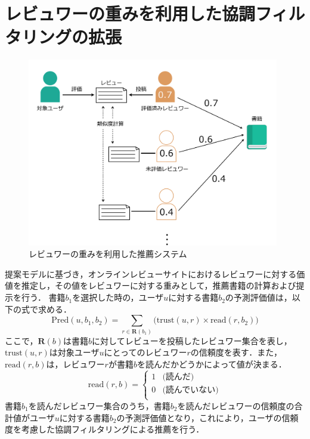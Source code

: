 \documentclass[a4paper,11pt,oneside,openany]{jsbook}
\begin{document}
\section{レビュワーの重みを利用した協調フィルタリングの拡張} %
\begin{figure}[tb]
	\begin{center} %
		\includegraphics[width = 110mm]{figures/model.pdf} %
	\end{center}
	\caption{レビュワーの重みを利用した推薦システム} %
	\label{fig:model} %
\end{figure}
提案モデルに基づき，オンラインレビューサイトにおけるレビュワーに対する価値を推定し，その値をレビュワーに対する重みとして，推薦書籍の計算および提示を行う．
書籍$b_{1}$を選択した時の，ユーザ$u$に対する書籍$b_{2}$の予測評価値は，以下の式で求める．
\begin{equation}
\mathrm{Pred}( u, b_{1}, b_{2} ) = \sum_{r\in{\mathbf{R}(b_{1})}}\bigl({\mathrm{trust}( u , r )}\times {\mathrm{read}( r , b_{2} )}\bigr)
\end{equation}
ここで，$\mathbf{R}(b)$は書籍$b$に対してレビューを投稿したレビュワー集合を表し，$\mathrm{trust}(u,r)$は対象ユーザ$u$にとってのレビュワー$r$の信頼度を表す．また，$\mathrm{read}(r,b)$は，レビュワー$r$が書籍$b$を読んだかどうかによって値が決まる．
\begin{equation}
	\mathrm{read}(r,b) =\left\{ \begin{array}{ll}
		1 & \mbox{(読んだ)} \\
		0 & \mbox{(読んでいない)} \\
	\end{array} \right.
\end{equation}
書籍$b_{1}$を読んだレビュワー集合のうち，書籍$b_{2}$を読んだレビュワーの信頼度の合計値がユーザ$u$に対する書籍$b_{2}$の予測評価値となり，これにより，ユーザの信頼度を考慮した協調フィルタリングによる推薦を行う．
\end{document}
